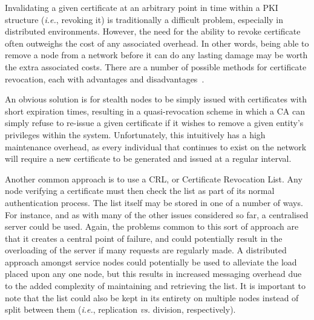 \documentclass{elsart3p}
\begin{document}
Invalidating a given certificate at an arbitrary point in time
within a PKI structure (\emph{i.e.}, revoking it) is traditionally a
difficult problem, especially in distributed environments. However,
the need for the ability to revoke certificate often outweighs the
cost of any associated overhead. In other words, being able to
remove a node from a network before it can do any lasting damage may
be worth the extra associated costs. There are a number of possible
methods for certificate revocation, each with advantages and
disadvantages~\cite{Zheng03Tradeoffs}.

An obvious solution is for stealth nodes to be simply issued with
certificates with short expiration times, resulting in a
quasi-revocation scheme in which a CA can simply refuse to re-issue
a given certificate if it wishes to remove a given entity's
privileges within the system. Unfortunately, this intuitively has a
high maintenance overhead, as every individual that continues to
exist on the network will require a new certificate to be generated
and issued at a regular interval.

Another common approach is to use a CRL, or Certificate Revocation
List. Any node verifying a certificate must then check the list as
part of its normal authentication process. The list itself may be
stored in one of a number of ways. For instance, and as with many of
the other issues considered so far, a centralised server could be
used. Again, the problems common to this sort of approach are that
it creates a central point of failure, and could potentially result
in the overloading of the server if many requests are regularly
made. A distributed approach amongst service nodes could potentially
be used to alleviate the load placed upon any one node, but this
results in increased messaging overhead due to the added complexity
of maintaining and retrieving the list. It is important to note that
the list could also be kept in its entirety on multiple nodes
instead of split between them (\emph{i.e.}, replication \emph{vs.}
division, respectively).
\end{document}
